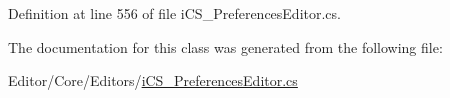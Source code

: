 Definition at line 556 of file i\+C\+S\+\_\+\+Preferences\+Editor.\+cs.



The documentation for this class was generated from the following file\+:\begin{DoxyCompactItemize}
\item 
Editor/\+Core/\+Editors/\hyperlink{i_c_s___preferences_editor_8cs}{i\+C\+S\+\_\+\+Preferences\+Editor.\+cs}\end{DoxyCompactItemize}
